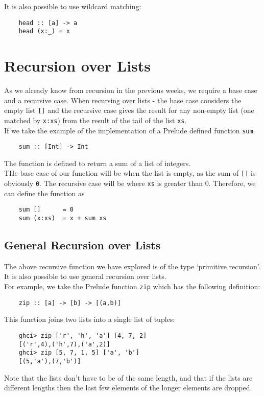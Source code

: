 It is also possible to use wildcard matching:
\begin{verbatim}
    head :: [a] -> a
    head (x:_) = x
\end{verbatim}


\section{Recursion over Lists}
As we already know from recursion in the previous weeks, we require a base case and a recursive case. When recursing over lists - the base case considers the empty list \verb|[]| and the recursive case gives the result for any non-empty list (one matched by \verb|x:xs|) from the result of the tail of the list \verb|xs|. \\

If we take the example of the implementation of a Prelude defined function \verb|sum|.
\begin{verbatim}
    sum :: [Int] -> Int
\end{verbatim}
The function is defined to return a sum of a list of integers.\\

THe base case of our function will be when the list is empty, as the sum of \verb|[]| is obviously \verb|0|. The recursive case will be where \verb|xs| is greater than 0. Therefore, we can define the function as
\begin{verbatim}
    sum []      = 0
    sum (x:xs)  = x + sum xs
\end{verbatim}

\subsection{General Recursion over Lists}
The above recursive function we have explored is of the type `primitive recursion'. It is also possible to use general recursion over lists.\\

For example, we take the Prelude function \verb|zip| which has the following definition:
\begin{verbatim}
    zip :: [a] -> [b] -> [(a,b)]
\end{verbatim}
This function joins two lists into a single list of tuples:
\begin{verbatim}
    ghci> zip ['r', 'h', 'a'] [4, 7, 2]
    [('r',4),('h',7),('a',2)]
    ghci> zip [5, 7, 1, 5] ['a', 'b']
    [(5,'a'),(7,'b')]
\end{verbatim}
Note that the lists don't have to be of the same length, and that if the lists are different lengths then the last few elements of the longer elements are dropped.\\

